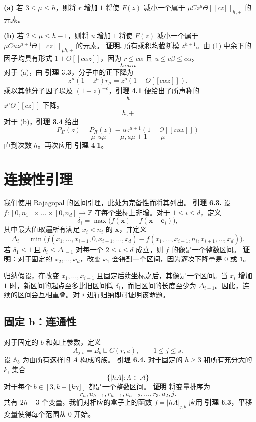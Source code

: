 \documentclass[11pt]{article}
\theoremstyle{break}
\begin{document}
\textbf{(a)} 若 $3 \leq \mu \leq h$，则将 $r$ 增加 $1$ 将使 $F(z)$ 减小一个属于 $\mu C z^\mu \Theta[[cz]]_{h,+}$ 的元素。

\textbf{(b)} 若 $2 \leq \mu \leq h-1$，则将 $u$ 增加 $1$ 将使 $F(z)$ 减小一个属于 $\mu C u z^{\mu+1} \Theta[[cz]]_{\mu h,+}$ 的元素。
\textbf{证明.} 所有乘积均截断模 $z^{h+1}$。由 (1) 中余下的因子均具有形式
$1+O [[c\alpha z]]$，因为 $r \le c\alpha$ 且 $u \le c\beta \le c\alpha$。
\[ h m m \]
对于 (a)，由 \textbf{引理 3.3}，分子中的正下降为
\[ z^\mu(1-z^\mu)r_\mu = z^\mu(1+O [[c\alpha z]]). \]
乘以其他分子因子以及 $(1-z)^{-c}$，\textbf{引理 4.1} 便给出了所声称的
\[ h \]
$z^\mu\Theta [[cz]]$ 下降。
\[ h,+ \]
对于 (b)，\textbf{引理 3.4} 给出
\[ P_{H}(z)-P_{H}(z) = u z^{\mu+1}(1+O [[c\alpha z]]) \]
\[ \mu,u\mu \qquad \mu,u\mu+1 \qquad \mu \]
直到次数 $h$。再次应用 \textbf{引理 4.1}。
\section{连接性引理}

我们使用 Rajagopal 的区间引理，此处为完备性而将其列出。
\textbf{引理 6.3.} 设 $f : [0,n_1] \times \dots \times [0,n_d] \to \mathbb{Z}$ 在每个坐标上非增。对于 $1 \le i \le d$，定义
\[
\delta_i = \max \big( f(\mathbf{x}) - f(\mathbf{x} + \mathbf{e}_i) \big),
\]
其中最大值取遍所有满足 $x_i < n_i$ 的 $\mathbf{x}$，并定义
\[
\Delta_i = \min \big( f(x_1, \dots, x_{i-1}, 0, x_{i+1}, \dots, x_d) - f(x_1, \dots, x_{i-1}, n_i, x_{i+1}, \dots, x_d) \big).
\]
若 $\delta_1 \le 1$ 且 $\delta_i \le \Delta_{i-1}$ 对每一个 $2 \le i \le d$ 成立，则 $f$ 的像是一个整数区间。
\textbf{证明}：对于固定的 $x_2, \dots, x_d$，改变 $x_1$ 会得到一个区间，因为逐次下降量是 $0$ 或 $1$。

归纳假设，在改变 $x_1, \dots, x_{i-1}$ 且固定后续坐标之后，其像是一个区间。当 $x_i$ 增加 $1$ 时，新区间的起点至多比旧区间低 $\delta_i$，而旧区间的长度至少为 $\Delta_{i-1}$。因此，连续的区间会互相重叠。对 $i$ 进行归纳即可证明该命题。
\subsection{固定 b：连通性}
对于固定的 $b$ 和如上参数，定义
\[ A_{j,b} = B_b \sqcup C(r,u), \qquad 1 \leq j \leq s. \]
设 $\mathbb{A}_b$ 为由所有这样的 $A$ 构成的族。
\textbf{引理 6.4.} 对于固定的 $h \ge 3$ 和所有充分大的 $k$, 集合
\[\{|hA| : A \in \mathcal{A}\}\]
对于每个 $b \in [3, k - \lfloor k \gamma \rfloor]$ 都是一个整数区间。
\textbf{证明} 将变量排序为
\[ r_h, u_{h-1}, r_{h-1}, u_{h-2}, \dots, r_3, u_2, j. \]
共有 $2h-3$ 个变量。我们对相应的盒子上的函数 $f = |hA|_{j,b}$ 应用 \textbf{引理 6.3}，平移变量使得每个范围从 0 开始。
\end{document}
